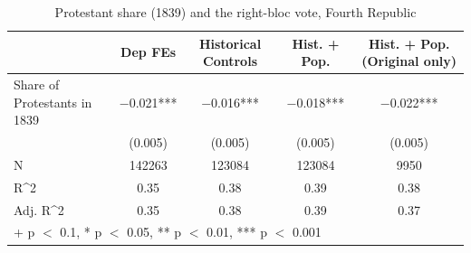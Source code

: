 \begin{table}
\centering
\caption{Protestant share (1839) and the right-bloc vote, Fourth Republic}
\centering
\begin{tabular}[t]{lcccc}
\toprule
  & Dep FEs & Historical Controls & Hist. + Pop. & Hist. + Pop. (Original only)\\
\midrule
Share of Protestants in 1839 & \num{-0.021}*** & \num{-0.016}*** & \num{-0.018}*** & \num{-0.022}***\\
 & (\num{0.005}) & (\num{0.005}) & (\num{0.005}) & (\num{0.005})\\
\midrule
N & \num{142263} & \num{123084} & \num{123084} & \num{9950}\\
R\textasciicircum{}2 & \num{0.35} & \num{0.38} & \num{0.39} & \num{0.38}\\
Adj. R\textasciicircum{}2 & \num{0.35} & \num{0.38} & \num{0.39} & \num{0.37}\\
\bottomrule
\multicolumn{5}{l}{\rule{0pt}{1em}+ p $<$ 0.1, * p $<$ 0.05, ** p $<$ 0.01, *** p $<$ 0.001}\\
\end{tabular}
\end{table}
